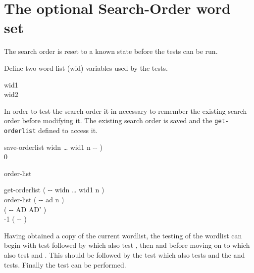 

\section{The optional Search-Order word set} %

The search order is reset to a known state before the tests can be
run.

\begin{tt}
  
\end{tt}

Define two word list (wid) variables used by the tests.

\begin{tt}
 wid1 \\
 wid2
\end{tt}

In order to test the search order it in necessary to remember the
existing search order before modifying it.  The existing search order
is saved and the \texttt{get-orderlist} defined to access it.

\begin{tt}
\word{:} save-orderlist  widn {\ldots} wid1 n -{}- ) \\
\tab {} \word{,} 0  \word{,}  \\
\word{;}

 order-list \\

\word{:} get-orderlist  ( -{}- widn {\ldots} wid1 n ) \\
\tab order-list   	\tab[1] ( -{}- ad n ) \\
\tab {} \word{+}							\tab[10.5] ( -{}- AD AD' ) \\
\tab {}   -1   \tab[1]  ( -{}- ) \\
\word{;}
\end{tt}

Having obtained a copy of the current wordlist, the testing of the
wordlist can begin with test  followed
by  which also test , then
 and  before moving on to
 which also test  and
.  This should be followed by the test
 which also tests  and the
 and  tests.
Finally the  test can be performed.

